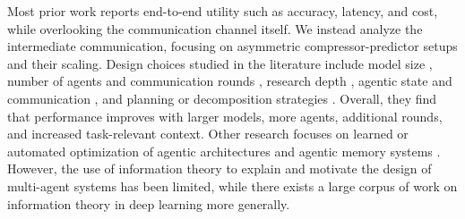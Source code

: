 \documentclass{article} %
\begin{document}
Most prior work reports end-to-end utility such as accuracy, latency, and cost, while overlooking the communication channel itself. We instead analyze the intermediate communication, focusing on asymmetric compressor-predictor setups and their scaling. Design choices studied in the literature include model size \citep{narayan2025minions, wang2024mixture}, number of agents and communication rounds \citep{chen2024more, kim2025towards, schluntz2025building}, research depth \citep{zhang2025web}, agentic state and communication \citep{li2025deepcode, zhang2025agentic, zou2025latent}, and planning or decomposition strategies \citep{chen2023agentverse, erdogan2025plan, saad2024archon, yao2023tree}. Overall, they find that performance improves with larger models, more agents, additional rounds, and increased task-relevant context. Other research focuses on learned or automated optimization of agentic architectures \citep{dang2025multi, hu2024automated, jiang2025adaptation, saad2024archon} and agentic memory systems \citep{han2025legomemmodularproceduralmemory, zhong2024memorybank, zhou2025mem1}.
However, the use of information theory to explain and motivate the design of multi-agent systems has been limited, while there exists a large corpus of work on information theory in deep learning more generally.

\end{document}
